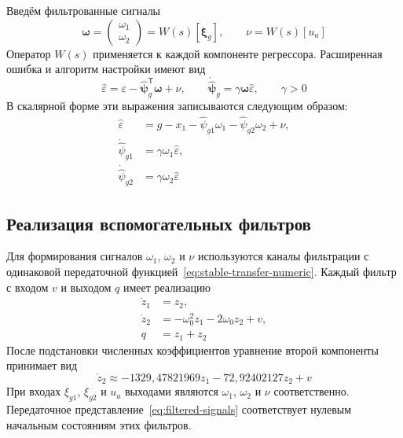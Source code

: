 Введём фильтрованные сигналы
\begin{equation}
  \bm\omega=\begin{pmatrix}\omega_1\\\omega_2\end{pmatrix}
    =W(s)[\bm\xi_g],
  \qquad \nu=W(s)[u_a]
  \label{eq:filtered-signals}
\end{equation}
Оператор $W(s)$ применяется к каждой компоненте регрессора.
Расширенная ошибка и алгоритм настройки имеют вид
\begin{equation}
  \hat\varepsilon
    =\varepsilon-\hat{\bm\psi}_g^{\mathsf T}\bm\omega+\nu,
  \qquad
  \dot{\hat{\bm\psi}}_g=\gamma\bm\omega\hat\varepsilon,
  \qquad \gamma>0
  \label{eq:adaptation}
\end{equation}
В скалярной форме эти выражения записываются следующим образом:
\begin{equation}
  \begin{aligned}
    \hat\varepsilon
      &=g-x_1-\hat\psi_{g1}\omega_1-\hat\psi_{g2}\omega_2+\nu,\\
    \dot{\hat\psi}_{g1}&=\gamma\omega_1\hat\varepsilon,\\
    \dot{\hat\psi}_{g2}&=\gamma\omega_2\hat\varepsilon
  \end{aligned}
  \label{eq:adaptation-scalar}
\end{equation}

\subsection{Реализация вспомогательных фильтров}

Для формирования сигналов $\omega_1$, $\omega_2$ и $\nu$ используются
каналы фильтрации с одинаковой передаточной
функцией~\eqref{eq:stable-transfer-numeric}.
Каждый фильтр с входом $v$ и выходом $q$ имеет реализацию
\begin{equation}
  \begin{aligned}
    \dot z_1&=z_2,\\
    \dot z_2&=-\omega_0^2z_1-2\omega_0z_2+v,\\
    q&=z_1+z_2
  \end{aligned}
  \label{eq:auxiliary-filter}
\end{equation}
После подстановки численных коэффициентов уравнение второй
компоненты принимает вид
\begin{equation}
  \dot z_2\approx-1329{,}47821969z_1-72{,}92402127z_2+v
  \label{eq:auxiliary-filter-numeric}
\end{equation}
При входах $\xi_{g1}$, $\xi_{g2}$ и $u_a$ выходами являются
$\omega_1$, $\omega_2$ и $\nu$ соответственно.
Передаточное представление~\eqref{eq:filtered-signals} соответствует
нулевым начальным состояниям этих фильтров.


